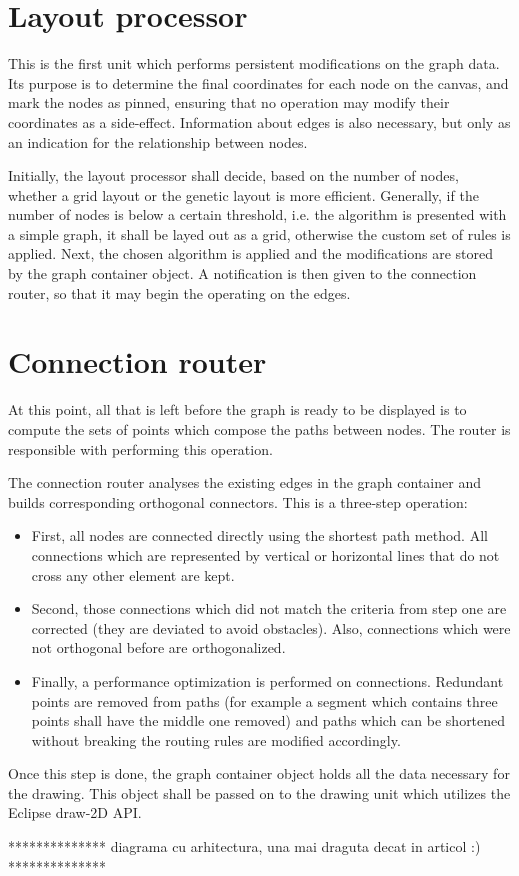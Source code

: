 \section{Layout processor}

This is the first unit which performs persistent modifications on the graph data. Its purpose is to determine 
the final coordinates for each node on the canvas, and mark the nodes as pinned, ensuring that no operation may 
modify their coordinates as a side-effect. Information about edges is also necessary, but only as an indication 
for the relationship between nodes.

Initially, the layout processor shall decide, based on the number of nodes, whether a grid layout or the genetic 
layout is more efficient. Generally, if the number of nodes is below a certain threshold, i.e. the algorithm is 
presented with a simple graph, it shall be layed out as a grid, otherwise the custom set of rules is applied. 
Next, the chosen algorithm is applied and the modifications are stored by the graph container object. A notification 
is then given to the connection router, so that it may begin the operating on the edges.

\section{Connection router}

At this point, all that is left before the graph is ready to be displayed is to compute the sets of points which compose 
the paths between nodes. The router is responsible with performing this operation.

The connection router analyses the existing edges in the graph container and builds corresponding orthogonal connectors.
This is a three-step operation:

\begin{itemize}

\item First, all nodes are connected directly using the shortest path method. All connections which are represented by 
vertical or horizontal lines that do not cross any other element are kept.

\item Second, those connections which did not match the criteria from step one are corrected (they are deviated to avoid 
obstacles). Also, connections which were not orthogonal before are orthogonalized.

\item Finally, a performance optimization is performed on connections. Redundant points are removed from paths (for example 
a segment which contains three points shall have the middle one removed) and paths which can be shortened without breaking 
the routing rules are modified accordingly.

\end{itemize}

Once this step is done, the graph container object holds all the data necessary for the drawing. This object shall be passed on 
to the drawing unit which utilizes the Eclipse draw-2D API.


************** diagrama cu arhitectura, una mai draguta decat in articol :) ************** 
